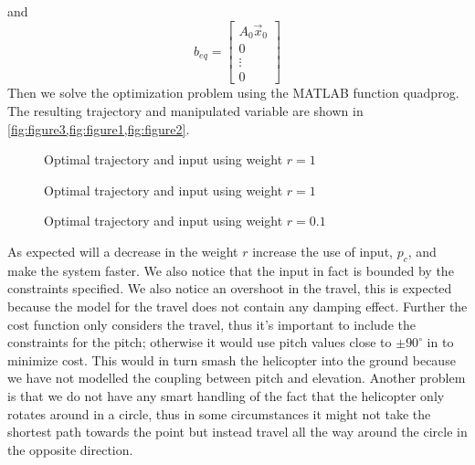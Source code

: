 and
\begin{equation*}
b_{eq} = \begin{bmatrix} A_0 \vec{x}_0 \\ 0 \\ \vdots \\ 0\end{bmatrix}
\end{equation*}
Then we solve the optimization problem using the MATLAB function quadprog. The resulting trajectory and manipulated variable are shown in \cref{fig:figure3,fig:figure1,fig:figure2}.
\begin{figure}[H] 
        \centering
        \setlength{\figureheight}{6cm}
        \setlength{\figurewidth}{10cm}
        
        \caption{Optimal trajectory and input using weight $r=1$} 
\label{fig:figure3} 
\end{figure}
\begin{figure}[H] 
        \centering
        \setlength{\figureheight}{6cm}
        \setlength{\figurewidth}{10cm}
        
        \caption{Optimal trajectory and input using weight $r=1$} 
\label{fig:figure1}
\end{figure}
\begin{figure}[H] 
        \centering
        \setlength{\figureheight}{6cm}
        \setlength{\figurewidth}{10cm}
        
        \caption{Optimal trajectory and input using weight $r=0.1$} 
\label{fig:figure2} 
\end{figure}
\noindent
As expected will a decrease in the weight $r$ increase the use of input, $p_c$, and make the system faster. We also notice that the input in fact is bounded by the constraints specified. We also notice an overshoot in the travel, this is expected because the model for the travel does not contain any damping effect. Further the cost function only considers the travel, thus it's important to include the constraints for the pitch; otherwise it would use pitch values close to $\pm90^\circ$ in to minimize cost. This would in turn smash the helicopter into the ground because we have not modelled the coupling between pitch and elevation. Another problem is that we do not have any smart handling of the fact that the helicopter only rotates around in a circle, thus in some circumstances it might not take the shortest path towards the point but instead travel all the way around the circle in the opposite direction.\\
\\
